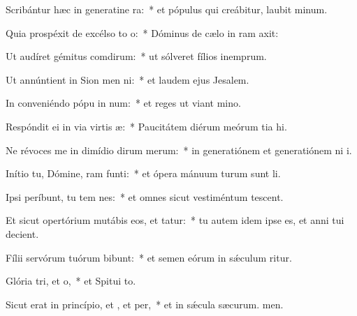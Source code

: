 \item Scribántur hæc in generatine ra:~* et pópulus qui creábitur, laubit minum.
\item Quia prospéxit de excélso to o:~* Dóminus de cælo in ram axit:
\item Ut audíret gémitus comdirum:~* ut sólveret fílios inemprum.
\item Ut annúntient in Sion men ni:~* et laudem ejus  Jesalem.
\item In conveniéndo pópu in num:~* et reges ut viant mino.
\item Respóndit ei in via virtis æ:~* Paucitátem diérum meórum tia hi.
\item Ne révoces me in dimídio dirum merum:~* in generatiónem et generatiónem ni i.
\item Inítio tu, Dómine, ram funti:~* et ópera mánuum turum sunt li.
\item Ipsi períbunt, tu tem nes:~* et omnes sicut vestiméntum tescent.
\item Et sicut opertórium mutábis eos, et tatur:~* tu autem idem ipse es, et anni tui  decient.
\item Fílii servórum tuórum bibunt:~* et semen eórum in sǽculum ritur.
\item Glória tri, et o,~* et Spitui to.
\item Sicut erat in princípio, et , et per,~* et in sǽcula sæcurum. men.
